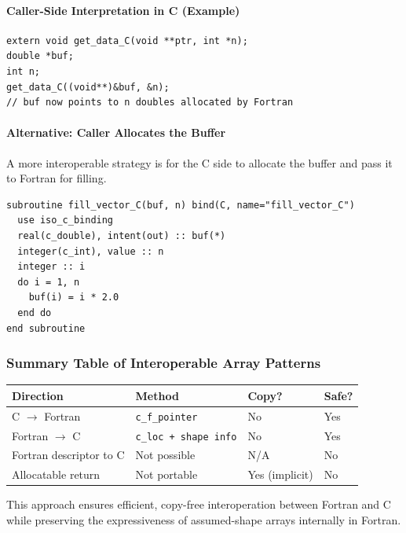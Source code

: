 \documentclass{article}
\begin{document}
\paragraph{Caller-Side Interpretation in C (Example)}

\begin{verbatim}
extern void get_data_C(void **ptr, int *n);
double *buf;
int n;
get_data_C((void**)&buf, &n);
// buf now points to n doubles allocated by Fortran
\end{verbatim}

\paragraph{Alternative: Caller Allocates the Buffer}

A more interoperable strategy is for the C side to allocate the buffer and pass it to Fortran for filling.

\begin{verbatim}
subroutine fill_vector_C(buf, n) bind(C, name="fill_vector_C")
  use iso_c_binding
  real(c_double), intent(out) :: buf(*)
  integer(c_int), value :: n
  integer :: i
  do i = 1, n
    buf(i) = i * 2.0
  end do
end subroutine
\end{verbatim}

\subsubsection{Summary Table of Interoperable Array Patterns}

\begin{center}
\begin{tabular}{|l|l|l|l|}
\hline
\textbf{Direction} & \textbf{Method} & \textbf{Copy?} & \textbf{Safe?} \\
\hline
C $\rightarrow$ Fortran & \texttt{c\_f\_pointer} & No & Yes \\
Fortran $\rightarrow$ C & \texttt{c\_loc + shape info} & No & Yes \\
Fortran descriptor to C & Not possible & N/A & No \\
Allocatable return & Not portable & Yes (implicit) & No \\
\hline
\end{tabular}
\end{center}

This approach ensures efficient, copy-free interoperation between Fortran and C while preserving the expressiveness of assumed-shape arrays internally in Fortran.
\end{document}
